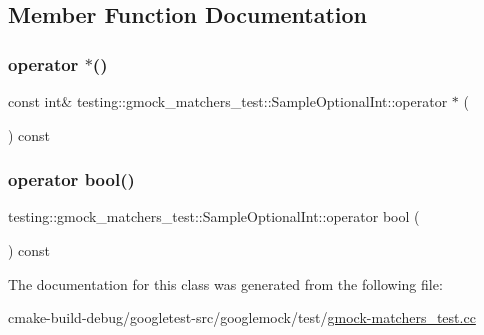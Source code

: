 \subsection{Member Function Documentation}
\mbox{\label{classtesting_1_1gmock__matchers__test_1_1SampleOptionalInt_a5e97f4536a008ab6f86b842a1e697532}} 
\subsubsection{\texorpdfstring{operator $\ast$()}{operator *()}}
{\footnotesize\ttfamily const int\& testing\+::gmock\+\_\+matchers\+\_\+test\+::\+Sample\+Optional\+Int\+::operator $\ast$ (\begin{DoxyParamCaption}{ }\end{DoxyParamCaption}) const\hspace{0.3cm}{\ttfamily [inline]}}

\mbox{\label{classtesting_1_1gmock__matchers__test_1_1SampleOptionalInt_a1e638b606b7e48b395a76304153c8f17}} 
\subsubsection{\texorpdfstring{operator bool()}{operator bool()}}
{\footnotesize\ttfamily testing\+::gmock\+\_\+matchers\+\_\+test\+::\+Sample\+Optional\+Int\+::operator bool (\begin{DoxyParamCaption}{ }\end{DoxyParamCaption}) const\hspace{0.3cm}{\ttfamily [inline]}}



The documentation for this class was generated from the following file\+:\begin{DoxyCompactItemize}
\item 
cmake-\/build-\/debug/googletest-\/src/googlemock/test/\mbox{\hyperlink{gmock-matchers__test_8cc}{gmock-\/matchers\+\_\+test.\+cc}}\end{DoxyCompactItemize}
